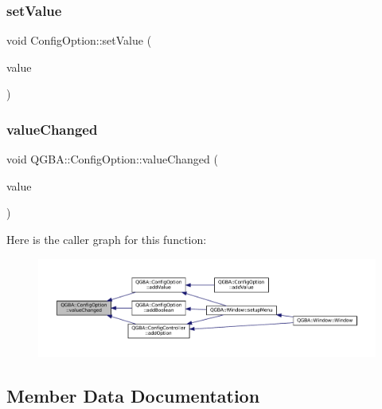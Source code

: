 \subsubsection{\texorpdfstring{set\+Value}{setValue}\hspace{0.1cm}{\footnotesize\ttfamily [5/5]}}
{\footnotesize\ttfamily void Config\+Option\+::set\+Value (\begin{DoxyParamCaption}\item[{const Q\+Variant \&}]{value }\end{DoxyParamCaption})\hspace{0.3cm}{\ttfamily [slot]}}

\mbox{\label{class_q_g_b_a_1_1_config_option_af19ac25e7fffc39de4b2a0084d35d903}} 
\subsubsection{\texorpdfstring{value\+Changed}{valueChanged}}
{\footnotesize\ttfamily void Q\+G\+B\+A\+::\+Config\+Option\+::value\+Changed (\begin{DoxyParamCaption}\item[{const Q\+Variant \&}]{value }\end{DoxyParamCaption})\hspace{0.3cm}{\ttfamily [signal]}}

Here is the caller graph for this function\+:
\nopagebreak
\begin{figure}[H]
\begin{center}
\leavevmode
\includegraphics[width=350pt]{class_q_g_b_a_1_1_config_option_af19ac25e7fffc39de4b2a0084d35d903_icgraph}
\end{center}
\end{figure}


\subsection{Member Data Documentation}
\mbox{\label{class_q_g_b_a_1_1_config_option_a6fb9c60435e842f49f839daa65bea137}} 
